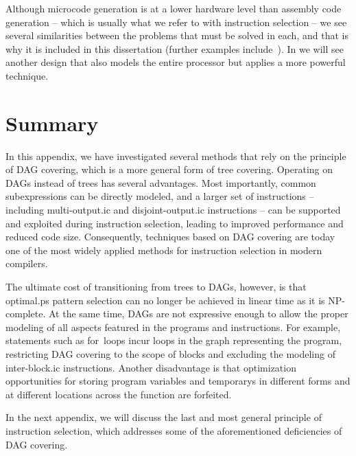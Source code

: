 Although \gls{microcode generation} is at a lower hardware level than
\gls{assembly code} generation -- which is usually what we refer to with
\gls{instruction selection} -- we see several similarities between the problems
that must be solved in each, and that is why it is included in this dissertation
(further examples include~\cite{BalakrishnanEtAl:1986, MahmoodEtAl:1990,
  LangevinCerny:1993}).
%
In  we will see another design that also models the
entire processor but applies a more powerful technique.


\section{Summary}

In this appendix, we have investigated several methods that rely on the
\gls{principle} of \gls{DAG covering}, which is a more general form of \gls{tree
  covering}.
%
Operating on \glspl{DAG} instead of \glspl{tree} has several advantages.
%
Most importantly, common subexpressions can be directly modeled, and a larger
set of \glspl{instruction} -- including \gls{multi-output.ic} and
\gls{disjoint-output.ic} \glspl{instruction} -- can be supported and exploited
during \gls{instruction selection}, leading to improved performance and reduced
code size.
%
Consequently, techniques based on \gls{DAG covering} are today one of the most
widely applied methods for \gls{instruction selection} in modern
\glspl{compiler}.

The ultimate cost of transitioning from \glspl{tree} to \glspl{DAG}, however, is
that \gls{optimal.ps} \gls{pattern selection} can no longer be achieved in
linear time as it is NP-complete.
%
At the same time, \glspl{DAG} are not expressive enough to allow the proper
modeling of all aspects featured in the \glspl{program} and \glspl{instruction}.
%
For example, statements such as \mbox{for loops} incur \glspl{loop} in the
\gls{graph} representing the \gls{program}, restricting \gls{DAG covering} to
the scope of \glspl{block} and excluding the modeling of \gls{inter-block.ic}
\glspl{instruction}.
%
Another disadvantage is that optimization opportunities for storing
\gls{program} variables and \glspl{temporary} in different forms and at
different locations across the \gls{function} are forfeited.

In the next appendix, we will discuss the last and most general \gls{principle}
of \gls{instruction selection}, which addresses some of the aforementioned
deficiencies of \gls{DAG covering}.
